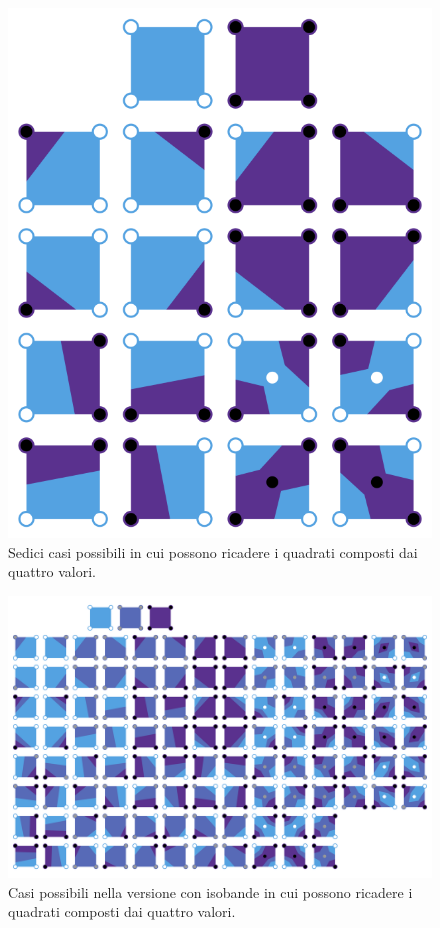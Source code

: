\documentclass[12pt,a4paper]{report}
\begin{document}
\begin{figure}[H]
    \centering
    \includegraphics[scale=0.27]{img/Marching_squares_isolines.svg.png}
    \caption{Sedici casi possibili in cui possono ricadere i quadrati composti dai quattro valori.}
\end{figure}
\begin{figure}[H]
    \centering
    \includegraphics[scale=0.15]{img/Marching_squares_isobands.svg.png}
    \caption{Casi possibili nella versione con isobande in cui possono ricadere i quadrati composti dai quattro valori.}
\end{figure}
\end{document}
